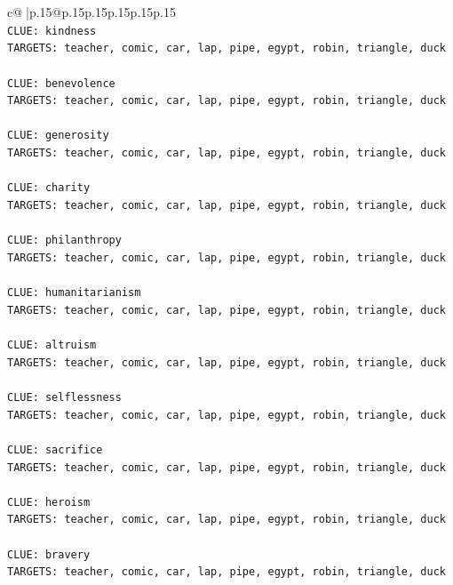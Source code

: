 \documentclass{article}
\begin{document}
{\begin{supertabular}{c@{$\;$}|p{.15\linewidth}@{}p{.15\linewidth}p{.15\linewidth}p{.15\linewidth}p{.15\linewidth}p{.15\linewidth}}
{{{\\ 
\texttt{CLUE: kindness} \\
\texttt{TARGETS: teacher, comic, car, lap, pipe, egypt, robin, triangle, duck} \\
\\ 
\texttt{CLUE: benevolence} \\
\texttt{TARGETS: teacher, comic, car, lap, pipe, egypt, robin, triangle, duck} \\
\\ 
\texttt{CLUE: generosity} \\
\texttt{TARGETS: teacher, comic, car, lap, pipe, egypt, robin, triangle, duck} \\
\\ 
\texttt{CLUE: charity} \\
\texttt{TARGETS: teacher, comic, car, lap, pipe, egypt, robin, triangle, duck} \\
\\ 
\texttt{CLUE: philanthropy} \\
\texttt{TARGETS: teacher, comic, car, lap, pipe, egypt, robin, triangle, duck} \\
\\ 
\texttt{CLUE: humanitarianism} \\
\texttt{TARGETS: teacher, comic, car, lap, pipe, egypt, robin, triangle, duck} \\
\\ 
\texttt{CLUE: altruism} \\
\texttt{TARGETS: teacher, comic, car, lap, pipe, egypt, robin, triangle, duck} \\
\\ 
\texttt{CLUE: selflessness} \\
\texttt{TARGETS: teacher, comic, car, lap, pipe, egypt, robin, triangle, duck} \\
\\ 
\texttt{CLUE: sacrifice} \\
\texttt{TARGETS: teacher, comic, car, lap, pipe, egypt, robin, triangle, duck} \\
\\ 
\texttt{CLUE: heroism} \\
\texttt{TARGETS: teacher, comic, car, lap, pipe, egypt, robin, triangle, duck} \\
\\ 
\texttt{CLUE: bravery} \\
\texttt{TARGETS: teacher, comic, car, lap, pipe, egypt, robin, triangle, duck} \\
\\ 
}}}
\end{supertabular}}
\end{document}
